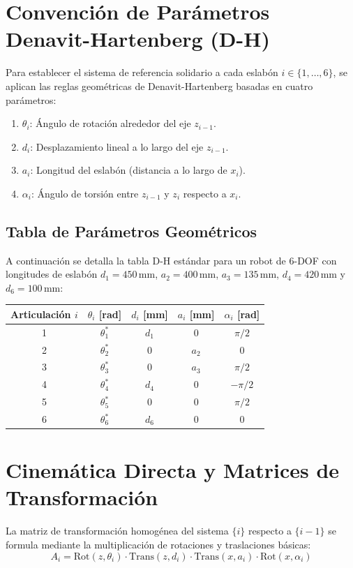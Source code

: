 \documentclass[11pt,a4paper]{article}
\begin{document}
\section{Convención de Parámetros Denavit-Hartenberg (D-H)}
Para establecer el sistema de referencia solidario a cada eslabón $i \in \{1,\dots,6\}$, se aplican las reglas geométricas de Denavit-Hartenberg basadas en cuatro parámetros:
\begin{enumerate}
    \item $\theta_i$: Ángulo de rotación alrededor del eje $z_{i-1}$.
    \item $d_i$: Desplazamiento lineal a lo largo del eje $z_{i-1}$.
    \item $a_i$: Longitud del eslabón (distancia a lo largo de $x_i$).
    \item $\alpha_i$: Ángulo de torsión entre $z_{i-1}$ y $z_i$ respecto a $x_i$.
\end{enumerate}

\subsection{Tabla de Parámetros Geométricos}
A continuación se detalla la tabla D-H estándar para un robot de 6-DOF con longitudes de eslabón $d_1 = 450\,\text{mm}$, $a_2 = 400\,\text{mm}$, $a_3 = 135\,\text{mm}$, $d_4 = 420\,\text{mm}$ y $d_6 = 100\,\text{mm}$:

\begin{table}[h]
\centering
\begin{tabular}{ccccc}
\hline
\textbf{Articulación $i$} & $\theta_i$ [rad] & $d_i$ [mm] & $a_i$ [mm] & $\alpha_i$ [rad] \\
\hline
1 & $\theta_1^*$ & $d_1$ & 0 & $\pi/2$ \\
2 & $\theta_2^*$ & 0 & $a_2$ & 0 \\
3 & $\theta_3^*$ & 0 & $a_3$ & $\pi/2$ \\
4 & $\theta_4^*$ & $d_4$ & 0 & $-\pi/2$ \\
5 & $\theta_5^*$ & 0 & 0 & $\pi/2$ \\
6 & $\theta_6^*$ & $d_6$ & 0 & 0 \\
\hline
\end{tabular}
\end{table}

\section{Cinemática Directa y Matrices de Transformación}
La matriz de transformación homogénea del sistema $\{i\}$ respecto a $\{i-1\}$ se formula mediante la multiplicación de rotaciones y traslaciones básicas:
\begin{equation}
A_i = \text{Rot}(z, \theta_i) \cdot \text{Trans}(z, d_i) \cdot \text{Trans}(x, a_i) \cdot \text{Rot}(x, \alpha_i)
\end{equation}
\end{document}
